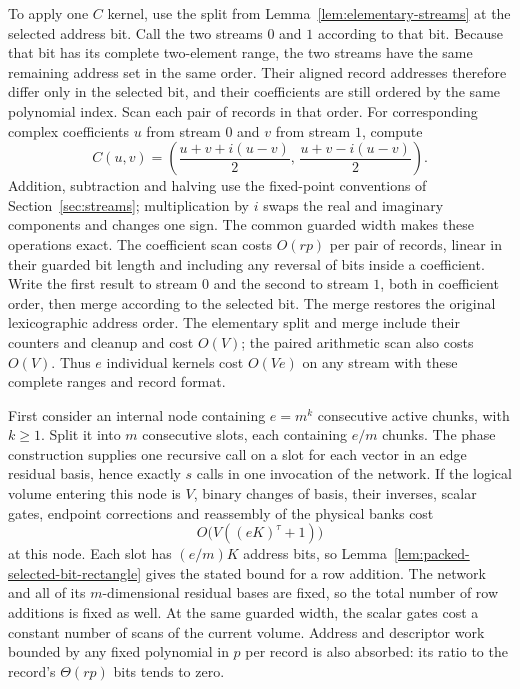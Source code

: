 \documentclass[11pt]{article}
\theoremstyle{definition}
\begin{document}
To apply one \(C\) kernel, use the split from
Lemma~\ref{lem:elementary-streams} at the selected address bit.
Call the two streams \(0\) and \(1\) according to that bit.
Because that bit has its complete two-element range, the two streams
have the same remaining address set in the same order.  Their aligned
record addresses therefore differ only in the selected bit, and their
coefficients are still ordered by the same polynomial index.  Scan
each pair of records in that order.  For corresponding complex
coefficients \(u\) from stream \(0\) and \(v\) from stream \(1\), compute
\begin{equation}\label{eq:individual-C-pair}
 C(u,v)=
 \left(\frac{u+v+i(u-v)}2,\,
       \frac{u+v-i(u-v)}2\right).
\end{equation}
Addition, subtraction and halving use the fixed-point conventions of
Section~\ref{sec:streams}; multiplication by \(i\) swaps the real
and imaginary components and changes one sign.  The common guarded
width makes these operations exact.  The coefficient scan costs
\(O(rp)\) per pair of records, linear in their guarded bit length
and including any reversal of bits inside a coefficient.  Write the
first result to stream \(0\) and the second to stream \(1\), both in
coefficient order, then merge
according to the selected bit.  The merge restores the original
lexicographic address order.  The elementary split and merge include
their counters and cleanup and cost \(O(V)\); the paired arithmetic
scan also costs \(O(V)\).  Thus \(e\) individual kernels cost
\(O(Ve)\) on any stream with these complete ranges and record format.

First consider an internal node containing \(e=m^k\) consecutive
active chunks, with \(k\ge1\).  Split it into \(m\) consecutive slots,
each containing \(e/m\) chunks.
The phase construction supplies one recursive call on a slot for each
vector in an edge residual basis, hence exactly \(s\) calls in one
invocation of the network.  If the logical volume entering this node
is \(V\), binary changes of basis, their inverses, scalar gates,
endpoint corrections and reassembly of the physical banks cost
\[
 O\bigl(V((eK)^\tau+1)\bigr)
\]
at this node.  Each slot has \((e/m)K\) address bits, so
Lemma~\ref{lem:packed-selected-bit-rectangle} gives the stated bound for a row addition.  The
network and all of its \(m\)-dimensional residual bases are fixed,
so the total number of row additions is fixed as well.  At the same
guarded width, the scalar gates cost a constant
number of scans of the current volume.  Address and descriptor
work bounded by any fixed polynomial in \(p\) per record is also
absorbed: its ratio to the record's \(\Theta(rp)\) bits tends to zero.
\end{document}
